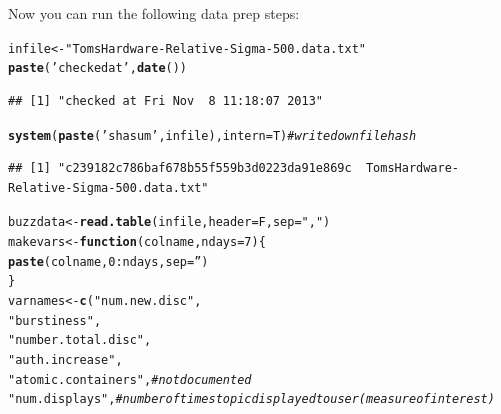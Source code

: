 \documentclass{article}\usepackage[]{graphicx}\usepackage[]{color}
\makeatletter
\newcommand{\hlnum}[1]{\textcolor[rgb]{0.686,0.059,0.569}{#1}}%
\newcommand{\hlstr}[1]{\textcolor[rgb]{0.192,0.494,0.8}{#1}}%
\newcommand{\hlcom}[1]{\textcolor[rgb]{0.678,0.584,0.686}{\textit{#1}}}%
\newcommand{\hlopt}[1]{\textcolor[rgb]{0,0,0}{#1}}%
\newcommand{\hlstd}[1]{\textcolor[rgb]{0.345,0.345,0.345}{#1}}%
\newcommand{\hlkwa}[1]{\textcolor[rgb]{0.161,0.373,0.58}{\textbf{#1}}}%
\newcommand{\hlkwb}[1]{\textcolor[rgb]{0.69,0.353,0.396}{#1}}%
\newcommand{\hlkwc}[1]{\textcolor[rgb]{0.333,0.667,0.333}{#1}}%
\newcommand{\hlkwd}[1]{\textcolor[rgb]{0.737,0.353,0.396}{\textbf{#1}}}%
\newenvironment{kframe}{%
 \def\at@end@of@kframe{}%
 \ifinner\ifhmode%
  \def\at@end@of@kframe{\end{minipage}}%
  \begin{minipage}{\columnwidth}%
 \fi\fi%
 \def\FrameCommand##1{\hskip\@totalleftmargin \hskip-\fboxsep
 \colorbox{shadecolor}{##1}\hskip-\fboxsep
     \hskip-\linewidth \hskip-\@totalleftmargin \hskip\columnwidth}%
 \MakeFramed {\advance\hsize-\width
   \@totalleftmargin\z@ \linewidth\hsize
   \@setminipage}}%
 {\par\unskip\endMakeFramed%
 \at@end@of@kframe}
\newenvironment{knitrout}{}{} %
\makeatother
\begin{document}
\begin{knitrout}
\color{fgcolor}\begin{kframe}


{\ttfamily\noindent\color{warningcolor}{\#\# Warning: file cache/\_\_objects not found\\\#\# Warning: file cache/\_\_globals not found}}\end{kframe}
\end{knitrout}


Now you can run the following data prep steps:

\begin{knitrout}
\color{fgcolor}\begin{kframe}
\begin{alltt}
\hlstd{infile} \hlkwb{<-} \hlstr{"TomsHardware-Relative-Sigma-500.data.txt"}
\hlkwd{paste}\hlstd{(}\hlstr{'checked at'}\hlstd{,}\hlkwd{date}\hlstd{())}
\end{alltt}
\begin{verbatim}
## [1] "checked at Fri Nov  8 11:18:07 2013"
\end{verbatim}
\begin{alltt}
\hlkwd{system}\hlstd{(}\hlkwd{paste}\hlstd{(}\hlstr{'shasum'}\hlstd{,infile),}\hlkwc{intern}\hlstd{=T)}  \hlcom{# write down file hash}
\end{alltt}
\begin{verbatim}
## [1] "c239182c786baf678b55f559b3d0223da91e869c  TomsHardware-Relative-Sigma-500.data.txt"
\end{verbatim}
\begin{alltt}
\hlstd{buzzdata} \hlkwb{<-} \hlkwd{read.table}\hlstd{(infile,} \hlkwc{header}\hlstd{=F,} \hlkwc{sep}\hlstd{=}\hlstr{","}\hlstd{)}
\hlstd{makevars} \hlkwb{<-} \hlkwa{function}\hlstd{(}\hlkwc{colname}\hlstd{,} \hlkwc{ndays}\hlstd{=}\hlnum{7}\hlstd{) \{}
  \hlkwd{paste}\hlstd{(colname,} \hlnum{0}\hlopt{:}\hlstd{ndays,} \hlkwc{sep}\hlstd{=}\hlstr{''}\hlstd{)}
\hlstd{\}}
\hlstd{varnames} \hlkwb{<-} \hlkwd{c}\hlstd{(}\hlstr{"num.new.disc"}\hlstd{,}
             \hlstr{"burstiness"}\hlstd{,}
             \hlstr{"number.total.disc"}\hlstd{,}
             \hlstr{"auth.increase"}\hlstd{,}
             \hlstr{"atomic.containers"}\hlstd{,} \hlcom{# not documented}
             \hlstr{"num.displays"}\hlstd{,} \hlcom{# number of times topic displayed to user (measure of interest)}

\end{alltt}
\end{kframe}
\end{knitrout}
\end{document}
